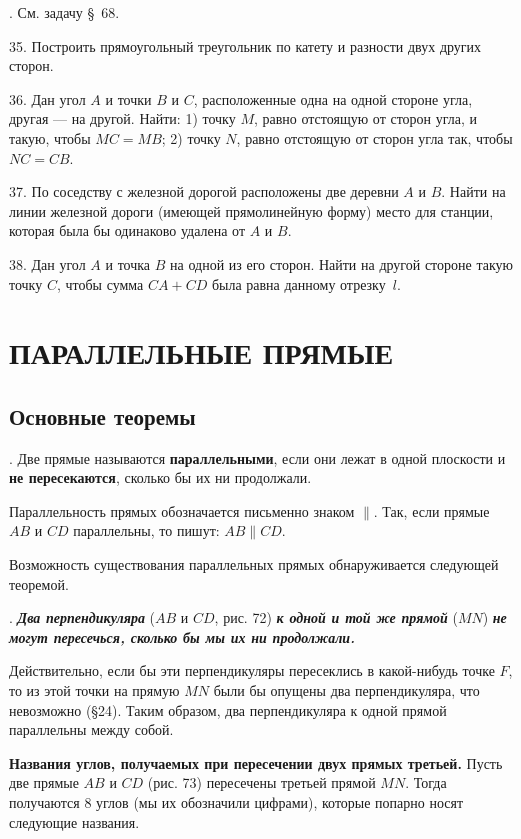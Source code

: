 \documentclass[oneside]{book}
\begin{document}
.
См.
задачу §~68.

35.
Построить прямоугольный треугольник по катету и разности двух других сторон.

36.
Дан угол $A$ и точки $B$ и $C$, расположенные одна на одной стороне угла, другая — на другой.
Найти:
1) точку $M$, равно отстоящую от сторон угла, и такую, чтобы $MC=MB$;
2) точку $N$, равно отстоящую от сторон угла так, чтобы $NC=CB$.

37.
По соседству с железной дорогой расположены две деревни $A$ и $B$.
Найти на линии железной дороги (имеющей прямолинейную форму) место для станции, которая была бы одинаково удалена от $A$ и $B$.

38.
Дан угол $A$ и точка $B$ на одной из его сторон.
Найти на другой стороне такую точку $C$, чтобы сумма $CA+CD$ была равна данному отрезку~$l$.


\section{ПАРАЛЛЕЛЬНЫЕ ПРЯМЫЕ}

\subsection*{Основные теоремы}

.
Две прямые называются \textbf{параллельными}, если они лежат в одной плоскости и \textbf{не пересекаются}, сколько бы их ни продолжали.

Параллельность прямых обозначается письменно знаком $\parallel$.
Так, если прямые $AB$ и $CD$ параллельны, то пишут:
$AB \parallel CD$.

Возможность существования параллельных прямых обнаруживается следующей теоремой.

.
\textbf{\emph{Два перпендикуляра}} ($AB$ и $CD$, рис. 72) \textbf{\emph{к одной и той же прямой}} ($MN$) \textbf{\emph{не могут пересечься, сколько бы мы их ни продолжали.}}

Действительно, если бы эти перпендикуляры пересеклись в какой-нибудь точке $F$, то из этой точки на прямую $MN$ были бы опущены два перпендикуляра, что невозможно (§24).
Таким образом, два перпендикуляра к одной прямой параллельны между собой.

\textbf{Названия углов, получаемых при пересечении двух прямых третьей.}
Пусть две прямые $AB$ и $CD$ (рис. 73) пересечены третьей прямой $MN$.
Тогда получаются 8 углов (мы их обозначили цифрами), которые попарно носят следующие названия.
\end{document}
